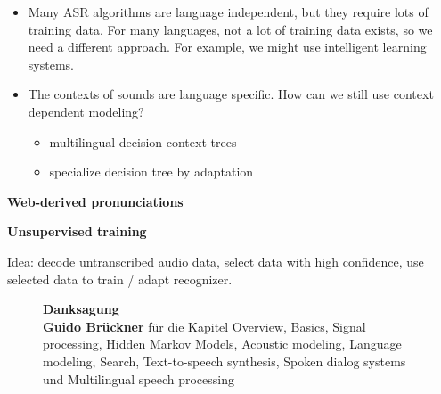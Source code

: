\documentclass[11pt]{article}
\begin{document}
\begin{itemize}
    \item Many ASR algorithms are language independent, but they require lots of training data. For many languages, not a lot of training data exists, so we need a different approach. For example, we might use intelligent learning systems.
    \item The contexts of sounds are language specific. How can we still use context dependent modeling?
        \begin{itemize}
            \item multilingual decision context trees
            \item specialize decision tree by adaptation
        \end{itemize}
\end{itemize}

\vspace{10pt}
\textbf{Web-derived pronunciations}
\vspace{5pt}

\vspace{10pt}
\textbf{Unsupervised training}
\vspace{5pt}

Idea: decode untranscribed audio data, select data with high confidence, use selected data to train / adapt recognizer.

\newpage

\begin{figure}
\centering
\textbf{Danksagung} \\
\textbf{Guido Brückner} für die Kapitel Overview, Basics, Signal processing, Hidden Markov Models, Acoustic modeling, Language modeling, Search, Text-to-speech synthesis, Spoken dialog systems und Multilingual speech processing
\end{figure}
\end{document}
